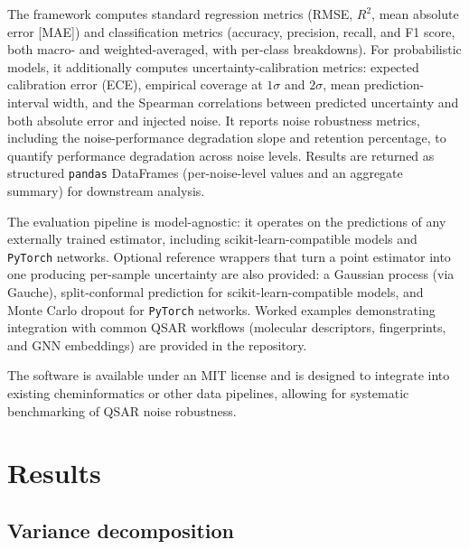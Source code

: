 \documentclass[pdflatex,sn-basic]{sn-jnl}%
\theoremstyle{thmstyleone}%
\theoremstyle{thmstyletwo}%
\theoremstyle{thmstylethree}%
\begin{document}
The framework computes standard regression metrics (RMSE, $R^2$, mean absolute error [MAE]) and classification metrics (accuracy, precision, recall, and F1 score, both macro- and weighted-averaged, with per-class breakdowns). For probabilistic models, it additionally computes uncertainty-calibration metrics: expected calibration error (ECE), empirical coverage at $1\sigma$ and $2\sigma$, mean prediction-interval width, and the Spearman correlations between predicted uncertainty and both absolute error and injected noise. It reports noise robustness metrics, including the noise-performance degradation slope and retention percentage, to quantify performance degradation across noise levels. Results are returned as structured \texttt{pandas} DataFrames (per-noise-level values and an aggregate summary) for downstream analysis.

The evaluation pipeline is model-agnostic: it operates on the predictions of any externally trained estimator, including scikit-learn-compatible models and \texttt{PyTorch} networks. Optional reference wrappers that turn a point estimator into one producing per-sample uncertainty are also provided: a Gaussian process (via Gauche), split-conformal prediction for scikit-learn-compatible models, and Monte Carlo dropout for \texttt{PyTorch} networks. Worked examples demonstrating integration with common QSAR workflows (molecular descriptors, fingerprints, and GNN embeddings) are provided in the repository.

The software is available under an MIT license \citep{noiseinject} and is designed to integrate into existing cheminformatics or other data pipelines, allowing for systematic benchmarking of QSAR noise robustness.


\section{Results}

\subsection{Variance decomposition}
\end{document}
